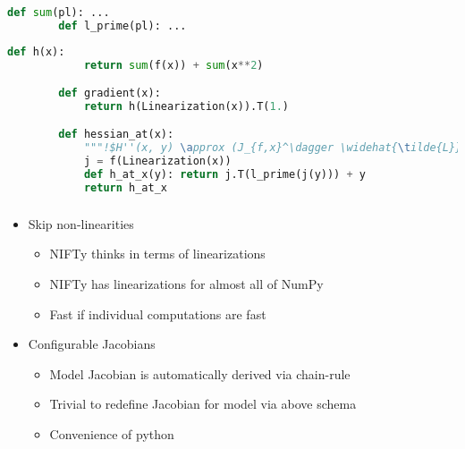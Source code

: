 \documentclass[aspectratio=169,xcolor=dvipsnames]{beamer}
\begin{document}
\begin{frame}[fragile]
	\frametitle{\insertsection}
	\framesubtitle{\insertsubsection}

	\begin{lstlisting}[language=python,escapechar=!]
		def sum(pl): ...
		def l_prime(pl): ...
	\end{lstlisting}

	\vspace{1em}
	\begin{lstlisting}[language=python,escapechar=!]
		def h(x):
			return sum(f(x)) + sum(x**2)

		def gradient(x):
			return h(Linearization(x)).T(1.)

		def hessian_at(x):
			"""!$H''(x, y) \approx (J_{f,x}^\dagger \widehat{\tilde{L}} J_{f,x} + 1)(y)$!"""
			j = f(Linearization(x))
			def h_at_x(y): return j.T(l_prime(j(y))) + y
			return h_at_x
	\end{lstlisting}

\end{frame}

\begin{frame}
	\frametitle{\insertsection}
	\framesubtitle{\insertsubsection}

	\begin{itemize}
		\item Skip non-linearities
		\begin{itemize}
			\item NIFTy thinks in terms of linearizations
			\item NIFTy has linearizations for almost all of NumPy
			\item Fast if individual computations are fast
		\end{itemize}
		\item Configurable Jacobians
		\begin{itemize}
			\item Model Jacobian is automatically derived via chain-rule
			\item Trivial to redefine Jacobian for model via above schema
			\item Convenience of python
		\end{itemize}
	\end{itemize}

\end{frame}
\end{document}
